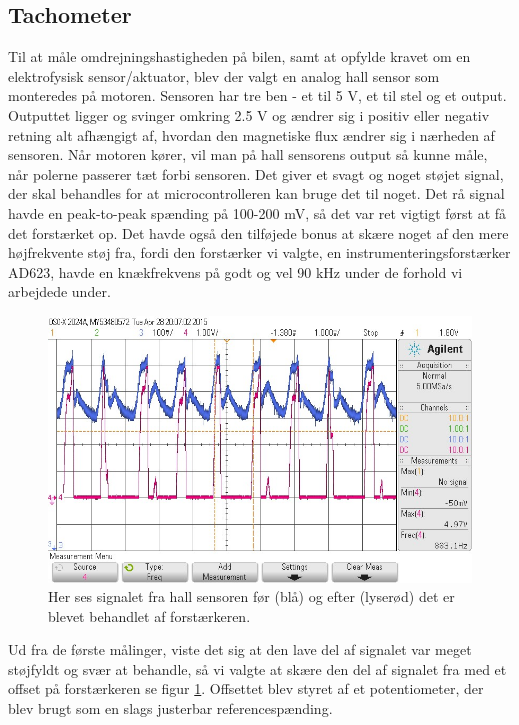 \subsection{Tachometer}

Til at måle omdrejningshastigheden på bilen, samt at opfylde kravet om en elektrofysisk sensor/aktuator, blev der valgt en analog hall sensor som monteredes på motoren. Sensoren har tre ben - et til 5 V, et til stel og et output. Outputtet ligger og svinger omkring 2.5 V og ændrer sig i positiv eller negativ retning alt afhængigt af, hvordan den magnetiske flux ændrer sig i nærheden af sensoren. Når motoren kører, vil man på hall sensorens output så kunne måle, når polerne passerer tæt forbi sensoren. Det giver et svagt og noget støjet signal, der skal behandles for at microcontrolleren kan bruge det til noget. Det rå signal havde en peak-to-peak spænding på 100-200 mV, så det var ret vigtigt først at få det forstærket op. Det havde også den tilføjede bonus at skære noget af den mere højfrekvente støj fra, fordi den forstærker vi valgte, en instrumenteringsforstærker AD623, havde en knækfrekvens på godt og vel 90 kHz under de forhold vi arbejdede under. 

\begin{figure}[h]

	\centering
		\includegraphics[scale=0.4]{Billeder/Signal1.jpg}
	\caption{Her ses signalet fra hall sensoren før (blå) og efter (lyserød) det er blevet behandlet af forstærkeren.}
	\label{fig:Signal1}
	
\end{figure}

Ud fra de første målinger, viste det sig at den lave del af signalet var meget støjfyldt og svær at behandle, så vi valgte at skære den del af signalet fra med et offset på forstærkeren se figur \ref{fig:Signal1}. Offsettet blev styret af et potentiometer, der blev brugt som en slags justerbar referencespænding.

